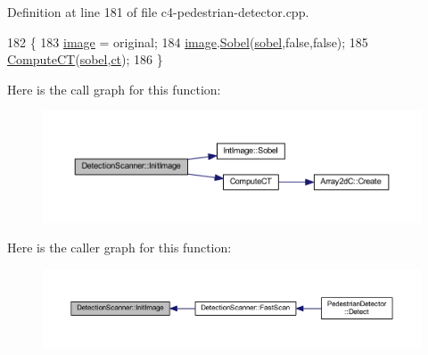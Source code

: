 Definition at line 181 of file c4-\/pedestrian-\/detector.\+cpp.


\begin{DoxyCode}
182 \{
183     \mbox{\hyperlink{class_detection_scanner_aa4e4cfa6cc0a2ffd044c6cd9721a6b59}{image}} = original;
184     \mbox{\hyperlink{class_detection_scanner_aa4e4cfa6cc0a2ffd044c6cd9721a6b59}{image}}.\mbox{\hyperlink{class_int_image_a35b8a5c2e64fa3ab50d6b14973f368b8}{Sobel}}(\mbox{\hyperlink{class_detection_scanner_a03bc015aac34a51133881b760b929a6b}{sobel}},\textcolor{keyword}{false},\textcolor{keyword}{false});
185     \mbox{\hyperlink{c4-pedestrian-detector_8cpp_a205804b2ee8558313222a898513a9543}{ComputeCT}}(\mbox{\hyperlink{class_detection_scanner_a03bc015aac34a51133881b760b929a6b}{sobel}},\mbox{\hyperlink{class_detection_scanner_a885861d4c08a9f9ae4da36f68866419b}{ct}});
186 \}
\end{DoxyCode}
Here is the call graph for this function\+:\nopagebreak
\begin{figure}[H]
\begin{center}
\leavevmode
\includegraphics[width=350pt]{class_detection_scanner_af275e1362a1bc351f9a92323e0860d27_cgraph}
\end{center}
\end{figure}
Here is the caller graph for this function\+:\nopagebreak
\begin{figure}[H]
\begin{center}
\leavevmode
\includegraphics[width=350pt]{class_detection_scanner_af275e1362a1bc351f9a92323e0860d27_icgraph}
\end{center}
\end{figure}
\mbox{\label{class_detection_scanner_a3fda62eb396e2bff3e2cd2b8ec5079a1}} 
